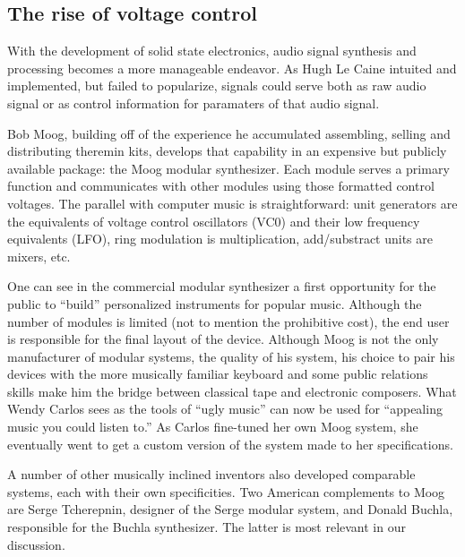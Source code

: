 \subsection{The rise of voltage control}

With the development of solid state electronics, audio signal synthesis and processing becomes a more manageable endeavor. As Hugh Le Caine intuited and implemented, but failed to popularize, signals could serve both as raw audio signal or as control information for paramaters of that audio signal. 

Bob Moog, building off of the experience he accumulated assembling, selling and distributing theremin kits, develops that capability in an expensive but publicly available package: the Moog modular synthesizer. Each module serves a primary function and communicates with other modules using those formatted control voltages. The parallel with computer music is straightforward: unit generators are the equivalents of voltage control oscillators (VC0) and their low frequency equivalents (LFO), ring modulation is multiplication, add/substract units are mixers, etc. 

One can see in the commercial modular synthesizer a first opportunity for the public to ``build'' personalized instruments for popular music. Although the number of modules is limited (not to mention the prohibitive cost), the end user is responsible for the final layout of the device. Although Moog is not the only manufacturer of modular systems, the quality of his system, his choice to pair his devices with the more musically familiar keyboard and some public relations skills make him the bridge between classical tape and electronic composers. What Wendy Carlos sees as the tools of ``ugly music'' can now be used for ``appealing music you could listen to.'' \cite[p.169]{holmes2002} As Carlos fine-tuned her own Moog system, she eventually went to get a custom version of the system made to her specifications. 

A number of other musically inclined inventors also developed comparable systems, each with their own specificities. Two American complements to Moog are Serge Tcherepnin, designer of the Serge modular system, and Donald Buchla, responsible for the Buchla synthesizer. The latter is most relevant in our discussion. 

